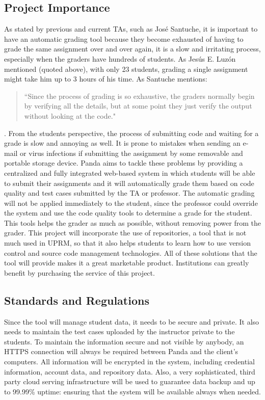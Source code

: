 \subsection{Project Importance}

As stated by previous and current TAs, such as José
Santuche, it is important to have an automatic grading tool because they become
exhausted of having to grade the same assignment over and over again, it is a
slow and irritating process, especially when the graders have hundreds of
students. As Jesús E. Luzón mentioned (quoted above), with only 23 students,
grading a single assignment might take him up to 3 hours of his time. As
Santuche mentions: \begin{quote} ``Since the process of grading is so exhaustive,
the graders normally begin by verifying all the details, but at some point they
just verify the output without looking at the code." \end{quote}. From the
students perspective, the process of submitting code and waiting for a grade is
slow and annoying as well. It is prone to mistakes when sending an e-mail or virus infections if submitting the assignment by some removable and portable storage device. Panda aims to tackle these problems by providing a
centralized and fully integrated web-based system in which students will be able
to submit their assignments and it will automatically grade them based on code
quality and test cases submitted by the TA or professor. The automatic grading
will not be applied immediately to the student, since the professor could
override the system and use the code quality tools to determine a grade for the
student. This tools helps the grader as much as possible, without removing power
from the grader. This project will incorporate the use of repositories, a tool
that is not much used in UPRM, so that it also helps students to learn
how to use version control and source code management technologies. All of
these solutions that the tool will provide makes it a great marketable product.
Institutions can greatly benefit by purchasing the service of this project.

\subsection{Standards and Regulations}

Since the tool will manage student data, it needs to be secure and private. It
also needs to maintain the test cases uploaded by the instructor private to the
students. To maintain the information secure and not visible by anybody, an
HTTPS connection will always be required between Panda and the client's
computers. All information will be encrypted in the system, including credential
information, account data, and repository data. Also, a very sophisticated,
third party cloud serving infrastructure will be used to guarantee data backup
and up to 99.99\% uptime: ensuring that the system will be available always when
needed.
